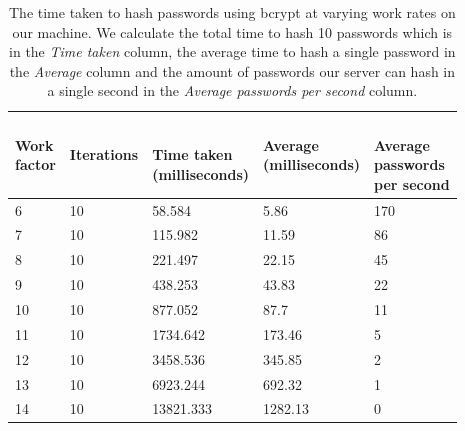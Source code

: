 \documentclass[12pt, titlepage]{article}
\begin{document}
\begin{table}[h]
	\begin{center}
    	\begin{tabular}{ | l | l | l | l | l | }
    \hline
    \shortstack{\textbf{Work} \\ \textbf{factor}} & \textbf{Iterations} & \shortstack{\\ \textbf{Time taken} \\ \textbf{(milliseconds)}} & \shortstack{\textbf{Average} \\ \textbf{(milliseconds)}} & \shortstack{ \\ \textbf{Average} \\ \textbf{passwords} \\ \textbf{per second}} \\
    \hline
    
    6 & 10 & 58.584 & 5.86 & 170 \\ \hline
    7 & 10 & 115.982 & 11.59 & 86 \\ \hline
    8 & 10 & 221.497 & 22.15 & 45 \\ \hline
    9 & 10 & 438.253 & 43.83 & 22 \\ \hline
    10 & 10 & 877.052 & 87.7 & 11 \\ \hline
    11 & 10 & 1734.642 & 173.46 & 5 \\ \hline
    12 & 10 & 3458.536 & 345.85 & 2 \\ \hline
    13 & 10 & 6923.244 & 692.32 & 1 \\ \hline
    14 & 10 & 13821.333 & 1282.13 & 0 \\ \hline
    \end{tabular}
    \caption{The time taken to hash passwords using bcrypt at varying work rates on our machine. We calculate the total time to hash 10 passwords which is in the \textit{Time taken} column, the average time to hash a single password in the \textit{Average} column and the amount of passwords our server can hash in a single second in the \textit{Average passwords per second} column.}
    \label{tab:bcryptWorkrates}
   \end{center}
\end{table}
\end{document}
